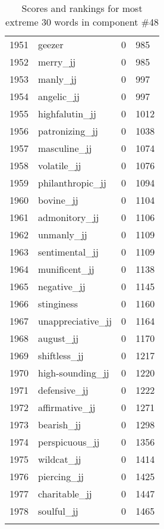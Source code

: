 \begin{longtable}[!htbp]{| rlr@{.}l |}
    1951 & geezer & 0 & 985 \\
    1952 & merry\_jj & 0 & 985 \\
    1953 & manly\_jj & 0 & 997 \\
    1954 & angelic\_jj & 0 & 997 \\
    1955 & highfalutin\_jj & 0 & 1012 \\
    1956 & patronizing\_jj & 0 & 1038 \\
    1957 & masculine\_jj & 0 & 1074 \\
    1958 & volatile\_jj & 0 & 1076 \\
    1959 & philanthropic\_jj & 0 & 1094 \\
    1960 & bovine\_jj & 0 & 1104 \\
    1961 & admonitory\_jj & 0 & 1106 \\
    1962 & unmanly\_jj & 0 & 1109 \\
    1963 & sentimental\_jj & 0 & 1109 \\
    1964 & munificent\_jj & 0 & 1138 \\
    1965 & negative\_jj & 0 & 1145 \\
    1966 & stinginess & 0 & 1160 \\
    1967 & unappreciative\_jj & 0 & 1164 \\
    1968 & august\_jj & 0 & 1170 \\
    1969 & shiftless\_jj & 0 & 1217 \\
    1970 & high-sounding\_jj & 0 & 1220 \\
    1971 & defensive\_jj & 0 & 1222 \\
    1972 & affirmative\_jj & 0 & 1271 \\
    1973 & bearish\_jj & 0 & 1298 \\
    1974 & perspicuous\_jj & 0 & 1356 \\
    1975 & wildcat\_jj & 0 & 1414 \\
    1976 & piercing\_jj & 0 & 1425 \\
    1977 & charitable\_jj & 0 & 1447 \\
    1978 & soulful\_jj & 0 & 1465 \\
    \hline
    \caption{Scores and rankings for most extreme 30 words in component \#48} \\
\end{longtable}
